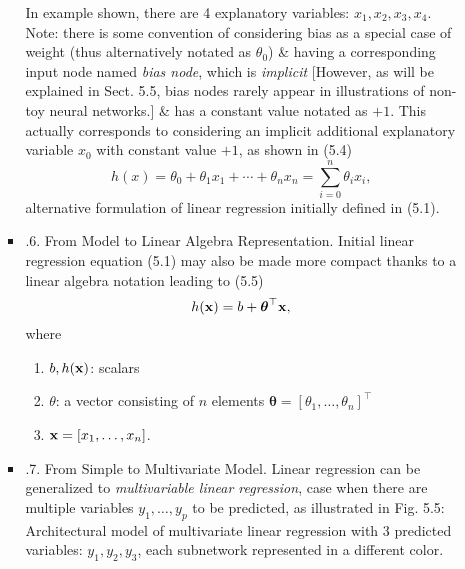 \documentclass{article}
\begin{document}
\begin{itemize}
\begin{itemize}
\begin{itemize}
			In example shown, there are 4 explanatory variables: $x_1,x_2,x_3,x_4$. Note: there is some convention of considering bias as a special case of weight (thus alternatively notated as $\theta_0$) \& having a corresponding input node named {\it bias node}, which is {\it implicit} [However, as will be explained in Sect. 5.5, bias nodes rarely appear in illustrations of non-toy neural networks.] \& has a constant value notated as $+1$. This actually corresponds to considering an implicit additional explanatory variable $x_0$ with constant value $+1$, as shown in (5.4)
			\begin{equation*}
				h(x) = \theta_0 + \theta_1x_1 + \cdots + \theta_nx_n = \sum_{i=0}^n \theta_ix_i,
			\end{equation*}
			alternative formulation of linear regression initially defined in (5.1).
			\item {.6. From Model to Linear Algebra Representation.} Initial linear regression equation (5.1) may also be made more compact thanks to a linear algebra notation leading to (5.5)
			\begin{equation*}
				h({\bf x}) = b + \boldsymbol{\theta}^\top{\bf x},
			\end{equation*}
			where
			\begin{enumerate}
				\item $b,h({\bf x})$: scalars
				\item $\theta$: a vector consisting of $n$ elements $\boldsymbol{\theta} = [\theta_1,\ldots,\theta_n]^\top$
				\item ${\bf x} = [x_1,\ldots,x_n]$.
			\end{enumerate}
			\item {.7. From Simple to Multivariate Model.} Linear regression can be generalized to {\it multivariable linear regression}, case when there are multiple variables $y_1,\ldots,y_p$ to be predicted, as illustrated in {\sf Fig. 5.5: Architectural model of multivariate linear regression} with 3 predicted variables: $y_1,y_2,y_3$, each subnetwork represented in a different color.


\end{itemize}
\end{itemize}
\end{itemize}
\end{document}

